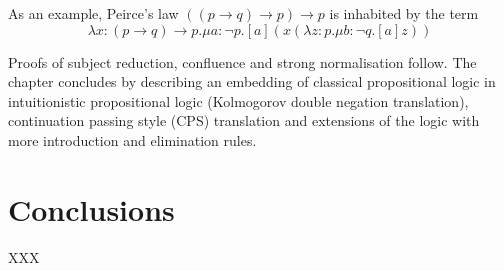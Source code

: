 \documentclass[12pt,toc=bibliography,numbers=noendperiod,
               footnotes=multiple,twoside]{scrartcl}
\begin{document}
As an example, Peirce's law \(((p \rightarrow q) \rightarrow p) \rightarrow p\) is inhabited by the term \[\lambda x:(p \rightarrow q) \rightarrow p.\mu a:\neg p.[a](x(\lambda z:p.\mu b:\neg q.[a]z))\]

Proofs of subject reduction, confluence and strong normalisation follow. The chapter concludes by describing an embedding of classical propositional logic in intuitionistic propositional logic (Kolmogorov double negation translation), continuation passing style (CPS) translation and extensions of the logic with more introduction and elimination rules.


\section{Conclusions}

XXX

\printbibliography
\end{document}

